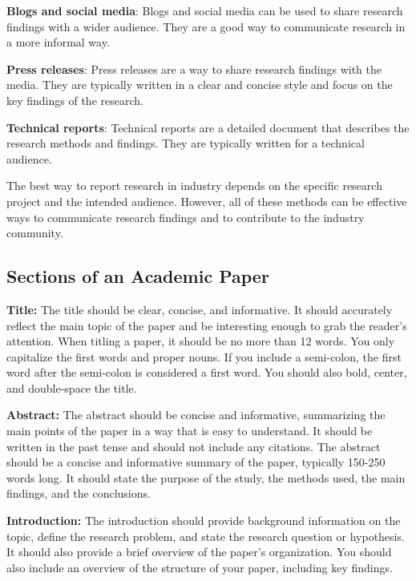 \documentclass[
]{book}
\begin{document}
\textbf{Blogs and social media}: Blogs and social media can be used to share research findings with a wider audience. They are a good way to communicate research in a more informal way.

\textbf{Press releases}: Press releases are a way to share research findings with the media. They are typically written in a clear and concise style and focus on the key findings of the research.

\textbf{Technical reports}: Technical reports are a detailed document that describes the research methods and findings. They are typically written for a technical audience.

The best way to report research in industry depends on the specific research project and the intended audience. However, all of these methods can be effective ways to communicate research findings and to contribute to the industry community.

\hypertarget{sections-of-an-academic-paper}{%
\subsection*{Sections of an Academic Paper}\label{sections-of-an-academic-paper}}

\textbf{Title:} The title should be clear, concise, and informative. It should accurately reflect the main topic of the paper and be interesting enough to grab the reader's attention. When titling a paper, it should be no more than 12 words. You only capitalize the first words and proper nouns. If you include a semi-colon, the first word after the semi-colon is considered a first word. You should also bold, center, and double-space the title.

\textbf{Abstract:} The abstract should be concise and informative, summarizing the main points of the paper in a way that is easy to understand. It should be written in the past tense and should not include any citations. The abstract should be a concise and informative summary of the paper, typically 150-250 words long. It should state the purpose of the study, the methods used, the main findings, and the conclusions.

\textbf{Introduction:} The introduction should provide background information on the topic, define the research problem, and state the research question or hypothesis. It should also provide a brief overview of the paper's organization. You should also include an overview of the structure of your paper, including key findings.
\end{document}
